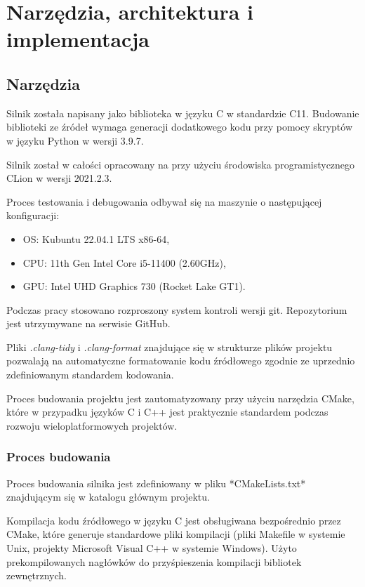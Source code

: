 \chapter{Narzędzia, architektura i implementacja}
\label{chap:algs}

\section{Narzędzia}

Silnik została napisany jako biblioteka w języku C w standardzie C11. Budowanie biblioteki ze źródeł wymaga generacji
dodatkowego kodu przy pomocy skryptów w języku Python w wersji 3.9.7.

Silnik został w całości opracowany na przy użyciu środowiska programistycznego CLion w wersji 2021.2.3.

Proces testowania i debugowania odbywał się na maszynie o następującej konfiguracji:
\begin{itemize}
	\item {OS}: Kubuntu 22.04.1 LTS x86-64,
	\item {CPU}: 11th Gen Intel Core i5-11400 (2.60GHz),
	\item {GPU}: Intel UHD Graphics 730 (Rocket Lake GT1).
\end{itemize}

Podczas pracy stosowano rozproszony system kontroli wersji git. Repozytorium jest utrzymywane na serwisie GitHub.

Pliki \textit{.clang-tidy} i \textit{.clang-format} znajdujące się w strukturze plików projektu pozwalają na automatyczne formatowanie
kodu źródłowego zgodnie ze uprzednio zdefiniowanym standardem kodowania.

Proces budowania projektu jest zautomatyzowany przy użyciu narzędzia CMake, które w przypadku języków C i C++ jest
praktycznie standardem podczas rozwoju wieloplatformowych projektów.

\subsection{Proces budowania}

Proces budowania silnika jest zdefiniowany w pliku *CMakeLists.txt* znajdującym się w katalogu głównym projektu.

Kompilacja kodu źródłowego w języku C jest obsługiwana bezpośrednio przez CMake, które generuje standardowe pliki
kompilacji (pliki Makefile w systemie Unix, projekty Microsoft Visual C++ w systemie Windows). Użyto prekompilowanych
nagłówków do przyśpieszenia kompilacji bibliotek zewnętrznych.

